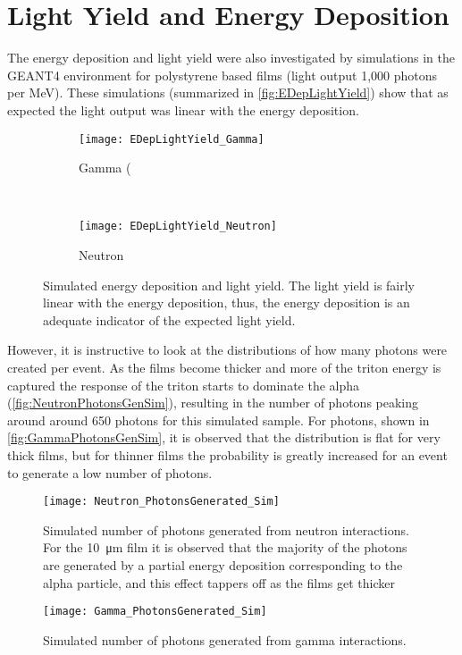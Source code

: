\section{Light Yield and Energy Deposition}
The energy deposition and light yield were also investigated by simulations in the GEANT4 environment for polystyrene based films (light output 1,000 photons per MeV).
These simulations (summarized in \autoref{fig:EDepLightYield}) show that as expected the light output was linear with the energy deposition.
\begin{figure*}[ht]
	\centering
	\begin{subfigure}[b]{0.45\textwidth}
    		\texttt{[image: EDepLightYield\_Gamma]}
		\caption{ Gamma (}
	\end{subfigure}%
	~
	\begin{subfigure}[b]{0.45\textwidth}
    		\texttt{[image: EDepLightYield\_Neutron]}
		  \caption{ Neutron}
	\end{subfigure}%
  \caption[Energy Deposition and Light Yield]{Simulated energy deposition and light yield.  The light yield is fairly linear with the energy deposition, thus, the energy deposition is an adequate indicator of the expected light yield.}
  \label{fig:EDepLightYield}
\end{figure*}
However, it is instructive to look at the distributions of how many photons were created per event.
As the films become thicker and more of the triton energy is captured the response of the triton starts to dominate the alpha (\autoref{fig:NeutronPhotonsGenSim}), resulting in the number of photons peaking around around 650 photons for this simulated sample.
For photons, shown in \autoref{fig:GammaPhotonsGenSim}, it is observed that the distribution is flat for very thick films, but for thinner films the probability is greatly increased for an event to generate a low number of photons.
\begin{figure}
  \centering
  \texttt{[image: Neutron\_PhotonsGenerated\_Sim]}
  \caption[Number of photons generated from neutron interactions]{Simulated number of photons generated from neutron interactions.  For the \SI{10}{\um} film it is observed that the majority of the photons are generated by a partial energy deposition corresponding to the alpha particle, and this effect tappers off as the films get thicker}
  \label{fig:NeutronPhotonsGenSim}
\end{figure}
\begin{figure}
  \centering
  \texttt{[image: Gamma\_PhotonsGenerated\_Sim]}
  \caption[Number of photons generated from gamma interactions]{Simulated number of photons generated from gamma interactions.}
  \label{fig:GammaPhotonsGenSim}
\end{figure}
